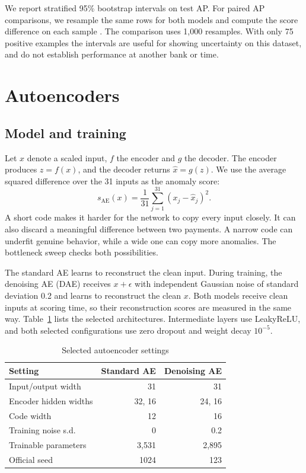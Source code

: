We report stratified 95\% bootstrap intervals on test AP. For paired AP comparisons, we resample the same rows for both models and compute the score difference on each sample \cite{efron1979bootstrap}. The comparison uses 1,000 resamples. With only 75 positive examples the intervals are useful for showing uncertainty on this dataset, and do not establish performance at another bank or time.

\section{Autoencoders}
\subsection{Model and training}
Let $x$ denote a scaled input, $f$ the encoder and $g$ the decoder. The encoder produces $z=f(x)$, and the decoder returns $\hat{x}=g(z)$. We use the average squared difference over the 31 inputs as the anomaly score:
\begin{equation}
s_{\mathrm{AE}}(x)=\frac{1}{31}\sum_{j=1}^{31}(x_j-\hat{x}_j)^2 .
\label{eq:mse-short}
\end{equation}
A short code makes it harder for the network to copy every input closely. It can also discard a meaningful difference between two payments. A narrow code can underfit genuine behavior, while a wide one can copy more anomalies. The bottleneck sweep checks both possibilities.

The standard AE learns to reconstruct the clean input. During training, the denoising AE (DAE) receives $x+\epsilon$ with independent Gaussian noise of standard deviation 0.2 and learns to reconstruct the clean $x$. Both models receive clean inputs at scoring time, so their reconstruction scores are measured in the same way. Table~\ref{tab:arch-short} lists the selected architectures. Intermediate layers use LeakyReLU, and both selected configurations use zero dropout and weight decay $10^{-5}$.

\begin{table}[t]
\centering
\caption{Selected autoencoder settings}
\label{tab:arch-short}
\small
\begin{tabular}{lrr}
\toprule
Setting & Standard AE & Denoising AE \\
\midrule
Input/output width & 31 & 31 \\
Encoder hidden widths & 32, 16 & 24, 16 \\
Code width & 12 & 16 \\
Training noise s.d. & 0 & 0.2 \\
Trainable parameters & 3,531 & 2,895 \\
Official seed & 1024 & 123 \\
\bottomrule
\end{tabular}
\end{table}

